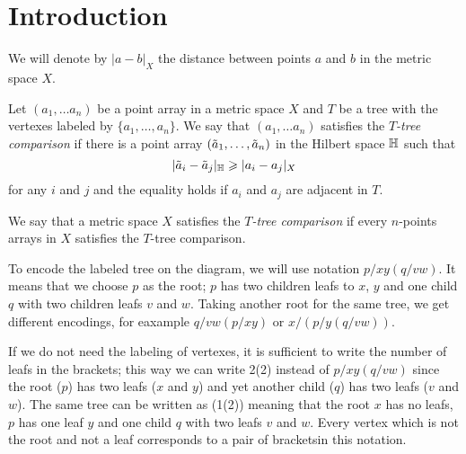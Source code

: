 \section{Introduction}\label{sec:intro}

We will denote by $|a-b|_X$ the distance between points $a$ and $b$ in the metric space $X$.

Let $(a_1,\dots a_n)$ be a point array in a metric space $X$ and $T$ be a 
tree with the vertexes labeled by $\{a_1,\dots,a_n\}$.
We say that $(a_1,\dots a_n)$  satisfies the \emph{$T$-tree comparison} if there is a point array $(\~a_1,\dots, \~a_n)$ in the Hilbert space $\HH$ such that 
\[|\~a_i-\~a_j|_\HH\ge|a_i-a_j|_X\]
for any $i$ and $j$ and the equality holds if $a_i$ and $a_j$ are adjacent in $T$.

We say that a metric space $X$ satisfies the \emph{$T$-tree comparison} if 
every $n$-points arrays in $X$ satisfies the $T$-tree comparison.

\hide
\begin{wrapfigure}{r}{27 mm}
\end{wrapfigure}
\unhide

To encode the labeled tree on the diagram, we will use notation $p/xy(q/vw)$.
It means that we choose $p$ as the root; 
$p$ has two children leafs to $x$, $y$ and one child $q$ with two children leafs $v$ and $w$.
Taking another root for the same tree, we get different encodings, for eaxample $q/vw(p/xy)$ or $x/(p/y(q/vw))$.

If we do not need the labeling of vertexes,
it is sufficient to write the number of leafs in the brackets;
this way we can write 2(2) instead of $p/xy(q/vw)$ since the root ($p$) has two leafs ($x$ and $y$) and yet another child ($q$) has two leafs ($v$ and $w$).  
The same tree can be written as (1(2)) meaning that the root $x$ has no leafs, $p$ has one leaf $y$ and one child $q$ with two leafs $v$ and $w$.
Every vertex which is not the root and not a leaf corresponds to a pair of bracketsin this notation.


